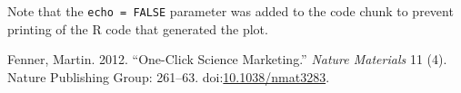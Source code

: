 \documentclass[]{article}
\begin{document}
Note that the \texttt{echo\ =\ FALSE} parameter was added to the code
chunk to prevent printing of the R code that generated the plot.

\hypertarget{refs}{}
\hypertarget{ref-fenner2012a}{}
Fenner, Martin. 2012. ``One-Click Science Marketing.'' \emph{Nature
Materials} 11 (4). Nature Publishing Group: 261--63.
doi:\href{https://doi.org/10.1038/nmat3283}{10.1038/nmat3283}.
\end{document}
